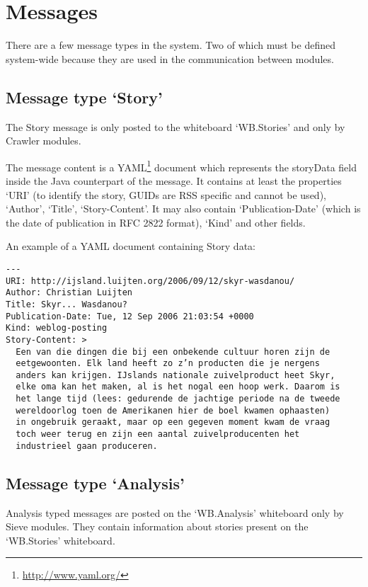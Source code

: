 \section{\label{sct:messages}Messages}

There are a few message types in the system. Two of which must be defined
system-wide because they are used in the communication between modules.

\subsection{Message type `Story'}

The Story message is only posted to the whiteboard `WB.Stories' and only by
Crawler modules.

The message content is a YAML\footnote{\url{http://www.yaml.org/}} document
which represents the storyData field inside the Java counterpart of the
message. It contains at least the properties `URI' (to identify the story,
GUIDs are RSS specific and cannot be used), `Author', `Title', `Story-Content'.
It may also contain `Publication-Date' (which is the date of publication in RFC
2822 format), `Kind' and other fields.

An example of a YAML document containing Story data:

\begin{verbatim}
---
URI: http://ijsland.luijten.org/2006/09/12/skyr-wasdanou/
Author: Christian Luijten
Title: Skyr... Wasdanou?
Publication-Date: Tue, 12 Sep 2006 21:03:54 +0000
Kind: weblog-posting
Story-Content: >
  Een van die dingen die bij een onbekende cultuur horen zijn de
  eetgewoonten. Elk land heeft zo z’n producten die je nergens
  anders kan krijgen. IJslands nationale zuivelproduct heet Skyr,
  elke oma kan het maken, al is het nogal een hoop werk. Daarom is
  het lange tijd (lees: gedurende de jachtige periode na de tweede
  wereldoorlog toen de Amerikanen hier de boel kwamen ophaasten)
  in ongebruik geraakt, maar op een gegeven moment kwam de vraag
  toch weer terug en zijn een aantal zuivelproducenten het
  industrieel gaan produceren.
\end{verbatim}

\subsection{Message type `Analysis'}

Analysis typed messages are posted on the `WB.Analysis' whiteboard only by
Sieve modules. They contain information about stories present on the
`WB.Stories' whiteboard.

